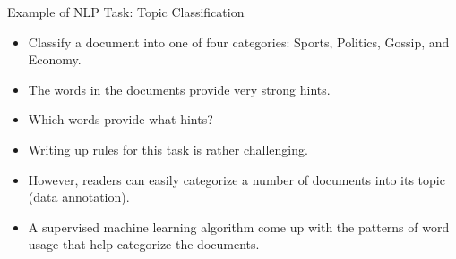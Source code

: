 \documentclass[handout]{beamer}
\begin{document}
\begin{frame}{Example of NLP Task: Topic Classification}
\begin{scriptsize}
\begin{itemize}
\item Classify a document into one of four categories: Sports, Politics, Gossip, and Economy. 
\item The words in the documents provide very strong hints.
\item Which words provide what hints? 
\item Writing up rules for this task is rather challenging. 
\item However, readers can easily categorize a number of documents into its topic (data annotation).
\item A supervised machine learning algorithm come up with the patterns of word usage that help categorize the documents.
\end{itemize}
\end{scriptsize}
\end{frame}
\end{document}
